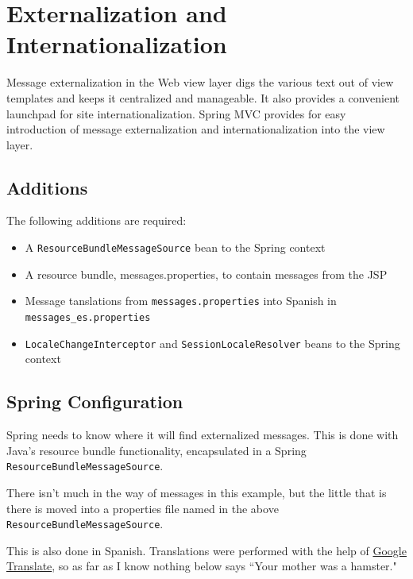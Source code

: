 \documentclass{article}
\begin{document}
\pagebreak
\section{Externalization and Internationalization}

Message externalization in the Web view layer digs the various text out of view templates and keeps it centralized and manageable.  It also provides a convenient launchpad for site internationalization.  Spring MVC provides for easy introduction of message externalization and internationalization into the view layer.

\subsection{Additions}

The following additions are required:

\begin{itemize}
\item A \texttt{ResourceBundleMessageSource} bean to the Spring context
\item A resource bundle, messages.properties, to contain messages from the JSP
\item Message tanslations from \texttt{messages.properties} into Spanish in \texttt{messages\_es.properties}
\item \texttt{LocaleChangeInterceptor} and \texttt{SessionLocaleResolver} beans to the Spring context
\end{itemize}

\subsection{Spring Configuration}

Spring needs to know where it will find externalized messages.  This is done with Java's resource bundle functionality, encapsulated in a Spring \texttt{ResourceBundleMessageSource}.



There isn't much in the way of messages in this example, but the little that is there is moved into a properties file named in the above \texttt{ResourceBundleMessageSource}.



This is also done in Spanish.  Translations were performed with the help of \href{http://translate.google.com/}{Google Translate}, so as far as I know nothing below says ``Your mother was a hamster."
\end{document}
